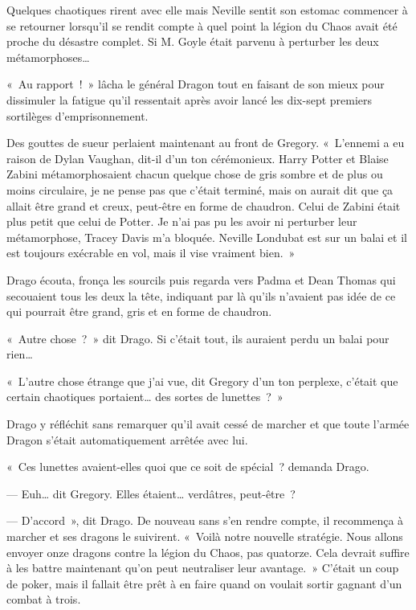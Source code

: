 Quelques chaotiques rirent avec elle mais Neville sentit son estomac commencer à se retourner lorsqu'il se rendit compte à quel point la légion du Chaos avait été proche du désastre complet. Si M. Goyle était parvenu à perturber les deux métamorphoses…

\later

«~Au rapport~!~» lâcha le général Dragon tout en faisant de son mieux pour dissimuler la fatigue qu'il ressentait après avoir lancé les dix-sept premiers sortilèges d'emprisonnement.

Des gouttes de sueur perlaient maintenant au front de Gregory. «~L'ennemi a eu raison de Dylan Vaughan, dit-il d'un ton cérémonieux. Harry Potter et Blaise Zabini métamorphosaient chacun quelque chose de gris sombre et de plus ou moins circulaire, je ne pense pas que c'était terminé, mais on aurait dit que ça allait être grand et creux, peut-être en forme de chaudron. Celui de Zabini était plus petit que celui de Potter. Je n'ai pas pu les avoir ni perturber leur métamorphose, Tracey Davis m'a bloquée. Neville Londubat est sur un balai et il est toujours exécrable en vol, mais il vise vraiment bien.~»

Drago écouta, fronça les sourcils puis regarda vers Padma et Dean Thomas qui secouaient tous les deux la tête, indiquant par là qu'ils n'avaient pas idée de ce qui pourrait être grand, gris et en forme de chaudron.

«~Autre chose~?~» dit Drago. Si c'était tout, ils auraient perdu un balai pour rien…

«~L'autre chose étrange que j'ai vue, dit Gregory d'un ton perplexe, c'était que certain chaotiques portaient… des sortes de lunettes~?~»

Drago y réfléchit sans remarquer qu'il avait cessé de marcher et que toute l'armée Dragon s'était automatiquement arrêtée avec lui.

«~Ces lunettes avaient-elles quoi que ce soit de spécial~? demanda Drago.

--- Euh… dit Gregory. Elles étaient… verdâtres, peut-être~?

--- D'accord~», dit Drago. De nouveau sans s'en rendre compte, il recommença à marcher et ses dragons le suivirent. «~Voilà notre nouvelle stratégie. Nous allons envoyer onze dragons contre la légion du Chaos, pas quatorze. Cela devrait suffire à les battre maintenant qu'on peut neutraliser leur avantage.~» C'était un coup de poker, mais il fallait être prêt à en faire quand on voulait sortir gagnant d'un combat à trois.

